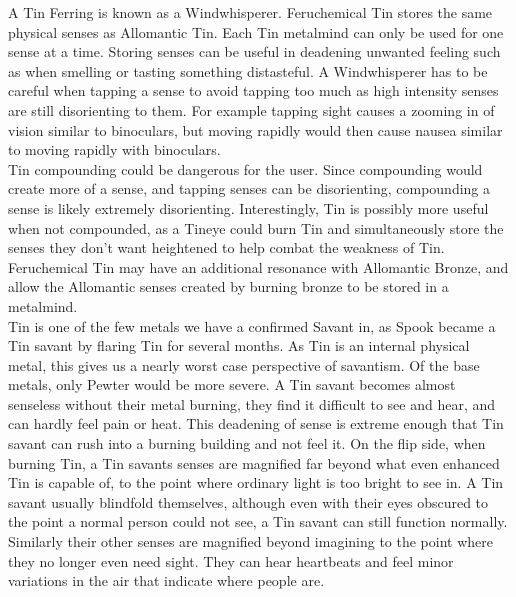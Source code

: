 \documentclass[conference]{IEEEtran}
\begin{document}
A Tin Ferring is known as a Windwhisperer.\cite{ARS}  Feruchemical Tin stores the same physical senses as Allomantic Tin.  Each Tin metalmind can only be used for one sense at a time.\cite{ARS}  Storing senses can be useful in deadening unwanted feeling such as when smelling or tasting something distasteful.\cite{WoA-CH15} 
A Windwhisperer has to be careful when tapping a sense to avoid tapping too much as high intensity senses are still disorienting to them.  For example tapping sight causes a zooming in of vision similar to binoculars,\cite{WoA-CH19} but moving rapidly would then cause nausea similar to moving rapidly with binoculars.   \\

Tin compounding could be dangerous for the user.  Since compounding would create more of a sense, and tapping senses can be disorienting, compounding a sense is likely extremely disorienting.  Interestingly, Tin is possibly more useful when not compounded, as a Tineye could burn Tin and simultaneously store the senses they don't want heightened to help combat the weakness of Tin.\\

Feruchemical Tin may have an additional resonance with Allomantic Bronze, and allow the Allomantic senses created by burning bronze to be stored in a metalmind.\cite{seeker-store}\\

Tin is one of the few metals we have a confirmed Savant in, as Spook became a Tin savant by flaring Tin for several months.\cite{WoF}  As Tin is an internal physical metal, this gives us a nearly worst case perspective of savantism.  Of the base metals, only Pewter would be more severe.\cite{WoF}  A Tin savant becomes almost senseless without their metal burning, they find it difficult to see and hear, and can hardly feel pain or heat.\cite{HoA-CH56}  This deadening of sense is extreme enough that Tin savant can rush into a burning building and not feel it.\cite{HoA-CH58}  On the flip side, when burning Tin, a Tin savants senses are magnified far beyond what even enhanced Tin is capable of, to the point where ordinary light is too bright to see in.\cite{HoA-CH16}  A Tin savant usually blindfold themselves, although even with their eyes obscured to the point a normal person could not see, a Tin savant can still function normally.\cite{HoA-CH16}  Similarly their other senses are magnified beyond imagining to the point where they no longer even need sight.\cite{HoA-CH16}  They can hear heartbeats\cite{HoA-CH14} and feel minor variations in the air that indicate where people are.\cite{HoA-CH41}\\
\end{document}
